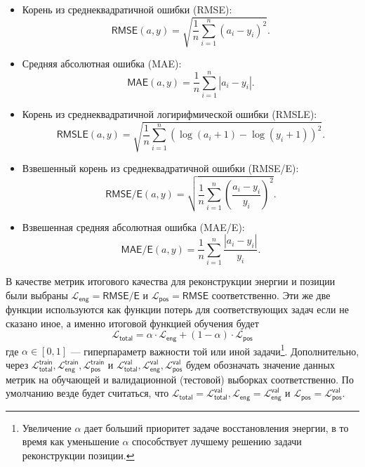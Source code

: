 \documentclass[a4paper,12pt]{extarticle}
\begin{document}
\begin{itemize}
    \item Корень из среднеквадратичной ошибки (\textsf{RMSE}): \[ \textsf{RMSE}(a, y) = \sqrt{\frac{1}{n} \sum_{i = 1}^{n} (a_i - y_i)^2} . \]
    \item Средняя абсолютная ошибка (\textsf{MAE}): \[ \textsf{MAE}(a, y) = \frac{1}{n} \sum_{i = 1}^{n} |a_i - y_i| . \]
    \item Корень из среднеквадратичной логирифмической ошибки (\textsf{RMSLE}): \[ \textsf{RMSLE}(a, y) = \sqrt{\frac{1}{n} \sum_{i = 1}^{n} (\log(a_i + 1) - \log(y_i + 1))^2} . \]
    \item Взвешенный корень из среднеквадратичной ошибки (\textsf{RMSE/E}): \[ \textsf{RMSE/E}(a, y) = \sqrt{\frac{1}{n} \sum_{i = 1}^{n} \left( \frac{a_i - y_i}{y_i} \right)^2} . \]
    \item Взвешенная средняя абсолютная ошибка (\textsf{MAE/E}): \[ \textsf{MAE/E}(a, y) = \frac{1}{n} \sum_{i = 1}^{n} \frac{|a_i - y_i|}{y_i} . \]
\end{itemize}

В качестве метрик итогового качества для реконструкции энергии и позиции были выбраны $\mathcal{L}_{\mathsf{eng}} = \textsf{RMSE/E}$ и $\mathcal{L}_{\mathsf{pos}} = \textsf{RMSE}$ соответственно. Эти же две функции используются как функции потерь для соответствующих задач если не сказано иное, а именно итоговой функцией обучения будет \begin{equation}\label{eq:loss_total}
    \mathcal{L}_{\mathsf{total}} = \alpha \cdot \mathcal{L}_{\mathsf{eng}} + (1 - \alpha) \cdot \mathcal{L}_{\mathsf{pos}}
\end{equation} где $\alpha \in [0, 1]$ --- гиперпараметр важности той или иной задачи\footnote{Увеличение $\alpha$ дает больший приоритет задаче восстановления энергии, в то время как уменьшение $\alpha$ способствует лучшему решению задачи реконструкции позиции.}. Дополнительно, через $\mathcal{L}_{\mathsf{total}}^{\mathsf{train}}, \mathcal{L}_{\mathsf{eng}}^{\mathsf{train}}, \mathcal{L}_{\mathsf{pos}}^{\mathsf{train}}$ и $\mathcal{L}_{\mathsf{total}}^{\mathsf{val}}, \mathcal{L}_{\mathsf{eng}}^{\mathsf{val}}, \mathcal{L}_{\mathsf{pos}}^{\mathsf{val}}$ будем обозначать значение данных метрик на обучающей и валидационной (тестовой) выборках соответственно. По умолчанию везде будет считаться, что $\mathcal{L}_{\mathsf{total}} = \mathcal{L}_{\mathsf{total}}^{\mathsf{val}}, \mathcal{L}_{\mathsf{eng}} = \mathcal{L}_{\mathsf{eng}}^{\mathsf{val}}$ и $\mathcal{L}_{\mathsf{pos}} = \mathcal{L}_{\mathsf{pos}}^{\mathsf{val}}$.
\end{document}

